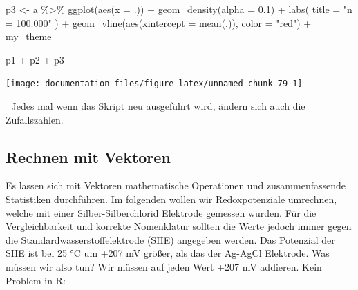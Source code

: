 \documentclass[
]{article}
\newenvironment{Shaded}{\begin{snugshade}}{\end{snugshade}}
\newcommand{\AttributeTok}[1]{\textcolor[rgb]{0.77,0.63,0.00}{#1}}
\newcommand{\FloatTok}[1]{\textcolor[rgb]{0.00,0.00,0.81}{#1}}
\newcommand{\FunctionTok}[1]{\textcolor[rgb]{0.00,0.00,0.00}{#1}}
\newcommand{\NormalTok}[1]{#1}
\newcommand{\OtherTok}[1]{\textcolor[rgb]{0.56,0.35,0.01}{#1}}
\newcommand{\SpecialCharTok}[1]{\textcolor[rgb]{0.00,0.00,0.00}{#1}}
\newcommand{\StringTok}[1]{\textcolor[rgb]{0.31,0.60,0.02}{#1}}
\begin{document}
\begin{Shaded}
\begin{Highlighting}[]
\NormalTok{p3 }\OtherTok{\textless{}{-}}\NormalTok{ a }\SpecialCharTok{\%\textgreater{}\%}
    \FunctionTok{ggplot}\NormalTok{(}\FunctionTok{aes}\NormalTok{(}\AttributeTok{x =}\NormalTok{ .)) }\SpecialCharTok{+}
    \FunctionTok{geom\_density}\NormalTok{(}\AttributeTok{alpha =} \FloatTok{0.1}\NormalTok{) }\SpecialCharTok{+}
    \FunctionTok{labs}\NormalTok{(}
        \AttributeTok{title =} \StringTok{"n = 100.000"}
\NormalTok{    ) }\SpecialCharTok{+}
    \FunctionTok{geom\_vline}\NormalTok{(}\FunctionTok{aes}\NormalTok{(}\AttributeTok{xintercept =} \FunctionTok{mean}\NormalTok{(.)), }\AttributeTok{color =} \StringTok{"red"}\NormalTok{) }\SpecialCharTok{+}
\NormalTok{    my\_theme}

\NormalTok{p1 }\SpecialCharTok{+}\NormalTok{ p2 }\SpecialCharTok{+}\NormalTok{ p3}
\end{Highlighting}
\end{Shaded}

\begin{center}\texttt{[image: documentation\_files/figure-latex/unnamed-chunk-79-1]} \end{center}

🚨 Jedes mal wenn das Skript neu ausgeführt wird, ändern sich auch die Zufallszahlen.

\hypertarget{rechnen-mit-vektoren}{%
\subsection{Rechnen mit Vektoren}\label{rechnen-mit-vektoren}}

Es lassen sich mit Vektoren mathematische Operationen und zusammenfassende Statistiken durchführen. Im folgenden wollen wir Redoxpotenziale umrechnen, welche mit einer Silber-Silberchlorid Elektrode gemessen wurden. Für die Vergleichbarkeit und korrekte Nomenklatur sollten die Werte jedoch immer gegen die Standardwasserstoffelektrode (SHE) angegeben werden. Das Potenzial der SHE ist bei 25 °C um +207 mV größer, als das der Ag-AgCl Elektrode. Was müssen wir also tun? Wir müssen auf jeden Wert +207 mV addieren. Kein Problem in R:
\end{document}
